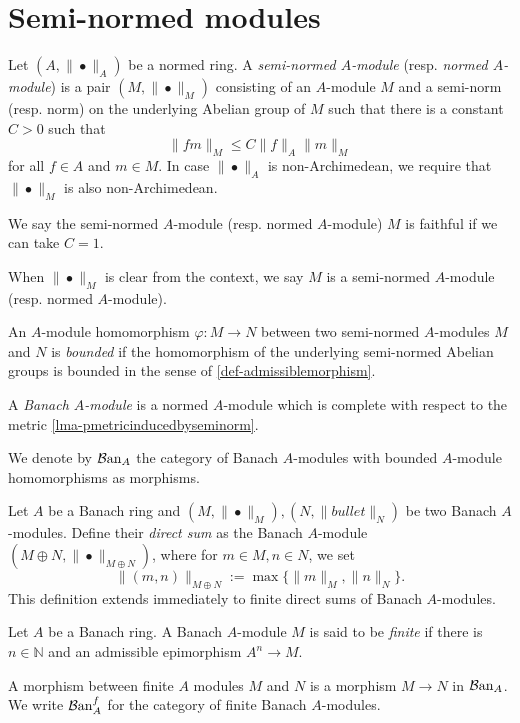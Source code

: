 \section{Semi-normed modules}

\begin{definition}
    Let $(A,\|\bullet\|_A)$ be a normed ring. A \emph{semi-normed $A$-module} (resp. \emph{normed $A$-module}) is a pair $(M,\|\bullet\|_M)$ consisting of an $A$-module $M$ and a semi-norm (resp. norm) on the underlying Abelian group of $M$ such that there is a constant $C>0$ such that
    \[
      \|fm\|_M \leq C \|f\|_A \|m\|_M
    \]
    for all $f\in A$ and $m\in M$. In case $\|\bullet\|_A$ is non-Archimedean, we require that $\|\bullet\|_M$ is also non-Archimedean. 

    We say the semi-normed $A$-module (resp. normed $A$-module) $M$ is faithful if we can take $C=1$.

    When $\|\bullet\|_M$ is clear from the context, we say $M$ is a semi-normed $A$-module (resp. normed $A$-module).

    An $A$-module homomorphism $\varphi:M\rightarrow N$ between two semi-normed $A$-modules $M$ and $N$ is \emph{bounded} if the homomorphism of the underlying semi-normed Abelian groups is bounded in the sense of \cref{def-admissiblemorphism}.

    A \emph{Banach $A$-module} is a normed $A$-module which is complete with respect to the metric \cref{lma-pmetricinducedbyseminorm}.

    We denote by $\mathcal{B}\mathrm{an}_A$ the category of Banach $A$-modules with bounded $A$-module homomorphisms as morphisms.
\end{definition}

\begin{definition}
    Let $A$ be a Banach ring and $(M,\|\bullet\|_M),(N,\|bullet\|_N)$ be two Banach $A$-modules. Define their \emph{direct sum} as the Banach $A$-module $(M\oplus N, \|\bullet\|_{M\oplus N})$, where for $m\in M, n\in N$, we set
    \[
        \|(m,n)\|_{M\oplus N}:=\max\{\|m\|_M,\|n\|_N \}.  
    \]
    This definition extends immediately to finite direct sums of Banach $A$-modules.
\end{definition}



\begin{definition}\label{def-finiteBanachmodules}
    Let $A$ be a Banach ring. A Banach $A$-module $M$ is said to be \emph{finite} if there is $n\in \mathbb{N}$ and an admissible epimorphism $A^n\rightarrow M$. 

    A morphism between finite $A$ modules $M$ and $N$  is a morphism $M\rightarrow N$ in $\mathcal{B}\mathrm{an}_A$. We write $\mathcal{B}\mathrm{an}_A^f$ for the category of finite Banach $A$-modules.
\end{definition}

